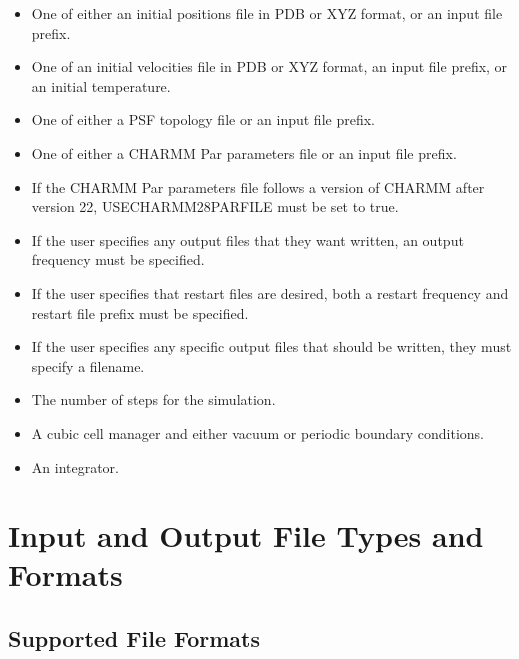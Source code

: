 \documentclass[11pt]{report}
\begin{document}
\begin{itemize}
  \item One of either an initial positions file in PDB or XYZ format, or an input file prefix.

  \item One of an initial velocities file in PDB or XYZ format, an input file prefix, or an initial temperature.

  \item One of either a PSF topology file or an input file prefix.

  \item One of either a CHARMM Par parameters file or an input file prefix.

  \item If the CHARMM Par parameters file follows a version of CHARMM after version 22, USECHARMM28PARFILE must be set to true.

  \item If the user specifies any output files that they want written, an output frequency must be specified.

  \item If the user specifies that restart files are desired, both a restart frequency and restart file prefix must be specified.

  \item If the user specifies any specific output files that should be written, they must specify a filename.

  \item The number of steps for the simulation.

  \item A cubic cell manager and either vacuum or periodic boundary
  conditions.

  \item An integrator.

\end{itemize}


\chapter{Input and Output File Types and Formats}


\section{Supported File Formats}
\end{document}

